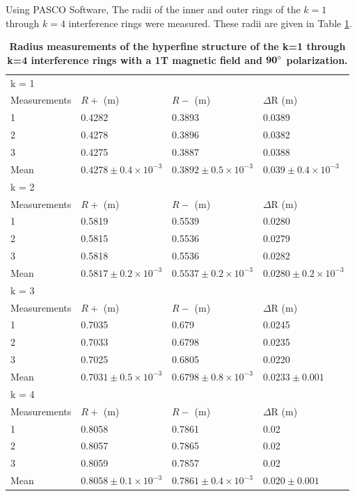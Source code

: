 \documentclass[twocolumn]{article}
\begin{document}
			Using PASCO Software, The radii of the inner and outer rings of the $k=1$ through $k=4$ interference rings were measured.
			These radii are given in Table \ref{tab:RadiusMeasurements}.
			
			\begin{table}[]
				\centering
				\begin{tabular}{l|lll}
					k = 1 & & & \\
					Measurements & $R+$ (m) & $R-$ (m)  & $\Delta$R (m) \\ \hline
					1         & 0.4282 & 0.3893  & 0.0389 \\
					2         & 0.4278 & 0.3896  & 0.0382 \\
					3         & 0.4275 & 0.3887  & 0.0388 \\
					Mean      & $0.4278\pm0.4\times10^{-3}$       & $0.3892\pm0.5\times10^{-3}$        & $0.039\pm0.4\times10^{-3}$ \\ \hline
					k = 2 & & & \\
					Measurements & $R+$ (m) & $R-$ (m)  & $\Delta$R (m) \\ \hline
					1           & 0.5819 & 0.5539 & 0.0280 \\
					2           & 0.5815 & 0.5536 & 0.0279 \\
					3           & 0.5818 & 0.5536 & 0.0282 \\
					Mean        & $0.5817\pm0.2\times10^{-3}$ & $0.5537\pm0.2\times10^{-3}$ & $0.0280\pm0.2\times10^{-3}$ \\ \hline
					k = 3 & & & \\
					Measurements & $R+$ (m) & $R-$ (m)  & $\Delta$R (m) \\ \hline
					1    & 0.7035 & 0.679  & 0.0245 \\
					2    & 0.7033 & 0.6798 & 0.0235 \\
					3    & 0.7025 & 0.6805 & 0.0220 \\
					Mean & $0.7031\pm0.5\times10^{-3}$ & $0.6798\pm0.8\times10^{-3}$ & $0.0233\pm0.001$ \\ \hline
					k = 4 & & & \\
					Measurements & $R+$ (m) & $R-$ (m)  & $\Delta$R (m) \\ \hline
					1    & 0.8058 & 0.7861 & 0.02  \\
					2    & 0.8057 & 0.7865 & 0.02  \\
					3    & 0.8059 & 0.7857 & 0.02  \\
					Mean & $0.8058\pm0.1\times10^{-3}$ & $0.7861\pm0.4\times10^{-3}$ & $0.020\pm0.001$
				\end{tabular}
				
				
				\caption{\textbf{Radius measurements of the hyperfine structure of the k=1 through k=4 interference rings with a 1T magnetic field and $\mathbf{90\degree}$ polarization.}}
				\label{tab:RadiusMeasurements}
			\end{table}
			
\end{document}
